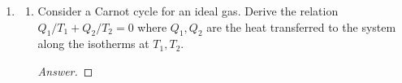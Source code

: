 \documentclass[../psets.tex]{subfiles}
\begin{document}
\begin{enumerate}
\begin{enumerate}
\begin{proof}[Answer]
            \begin{equation*}
                \boxed{w = P(V_b-V_a)}
            \end{equation*}
            Additionally, since $PV_a=nRT_a$ and $PV_b=nRT_b$, we have that
            \begin{align*}
                \Delta U &= \int_{T_a}^{T_b}C_V\dd{T}\\
                &= C_V(T_b-T_a)\\
                \Aboxed{\Delta U &= \frac{C_VP}{nR}(V_b-V_a)}
            \end{align*}
        \end{proof}
    \end{enumerate}
    \item 
    \begin{enumerate}
        \item Consider a Carnot cycle for an ideal gas. Derive the relation $Q_1/T_1+Q_2/T_2=0$ where $Q_1,Q_2$ are the heat transferred to the system along the isotherms at $T_1,T_2$.
        \begin{proof}[Answer]
            

\end{proof}
\end{enumerate}
\end{enumerate}
\end{document}
